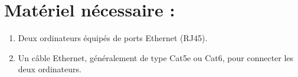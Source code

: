 
%


\section{Matériel nécessaire :}
\begin{enumerate}
    \item Deux ordinateurs équipés de ports Ethernet (RJ45).
    \item Un câble Ethernet, généralement de type Cat5e ou Cat6, pour connecter les deux ordinateurs.
\end{enumerate}

